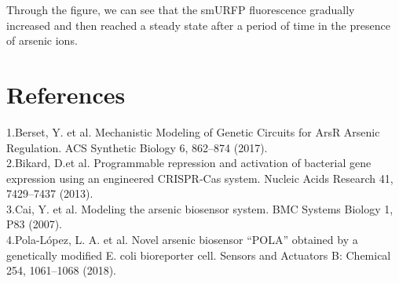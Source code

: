 Through the figure, we can see that the smURFP fluorescence gradually increased and then reached a steady state after a period of time  in the presence of arsenic ions.

\section{References} 
1.Berset, Y. et al. Mechanistic Modeling of Genetic Circuits for ArsR Arsenic Regulation. ACS Synthetic Biology 6, 862–874 (2017).\\

2.Bikard, D.et al. Programmable repression and activation of bacterial gene expression using an engineered CRISPR-Cas system. Nucleic Acids Research 41, 7429–7437 (2013).\\

3.Cai, Y. et al. Modeling the arsenic biosensor system. BMC Systems Biology 1, P83 (2007).\\

4.Pola-López, L. A. et al. Novel arsenic biosensor “POLA” obtained by a genetically modified E. coli bioreporter cell. Sensors and Actuators B: Chemical 254, 1061–1068 (2018).









